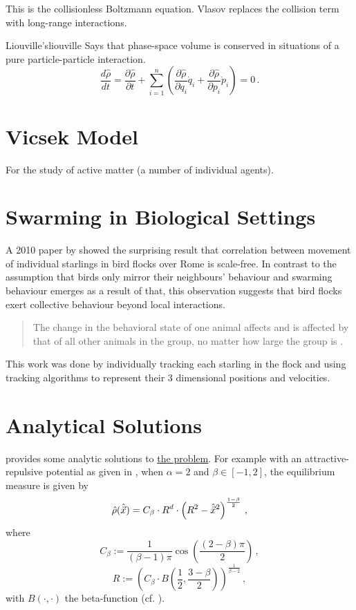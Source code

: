 This is the collisionless Boltzmann equation.
Vlasov replaces the collision term with long-range interactions.

\begin{theorem}{Liouville's}{liouville}
  Says that phase-space volume is conserved in situations of a pure particle-particle interaction.
  $$\frac{d\hat{\rho}}{dt}=
    \frac{\partial\hat{\rho}}{\partial t}
    +\sum_{i=1}^n\left(\frac{\partial\hat{\rho}}{\partial q_i}\dot{q}_i
    +\frac{\partial\hat{\rho}}{\partial p_i}\dot{p}_i\right)=0\,.$$
\end{theorem}

\section{Vicsek Model}
For the study of active matter (a number of individual agents).
\hierKoennteIhreWerbungStehen

\section{Swarming in Biological Settings}
A 2010 paper by \citeauthor{2010-starlings} showed the surprising result that correlation between movement of individual starlings in bird flocks over Rome is scale-free.
In contrast to the assumption that birds only mirror their neighbours' behaviour and swarming behaviour emerges as a result of that, this observation suggests that bird flocks exert collective behaviour beyond local interactions.
\begin{quote}
  The change in the behavioral state of one animal affects and is affected by that of all other animals in the group, no matter how large the group is
  \parencite{2010-starlings}.
\end{quote}
This work was done by individually tracking each starling in the flock and using tracking algorithms to represent their 3 dimensional positions and velocities.

\section{Analytical Solutions}
\label{sec:analytical-solutions}
\cite{2017-explicit-solutions} provides some analytic solutions to \hyperref[def:the-problem]{the problem}.
For example with an attractive-repulsive potential as given in , when $\alpha = 2$ and $\beta \in [-1, 2]$, the equilibrium measure is given by
\begin{equation}
  \hat{\rho}(\hat{\vec{x}}) = C_\beta \cdot R^d \cdot \left(R^2 - \hat{\vec{x}}^2\right)^{\frac{1-\beta}{2}}\,,
  \label{eq:analytical-solution-alpha-equal-2}
\end{equation}
where
$$C_\beta := \frac{1}{(\beta - 1) \pi} \cos\left(\frac{(2 - \beta) \pi}{2}\right)\,,$$
$$R := \left(C_\beta \cdot B\left(\frac{1}{2}, \frac{3 - \beta}{2}\right)\right)^{\frac{1}{\beta - 2}}\,,$$
with $B(\cdot, \cdot)$ the beta-function (cf. ).

